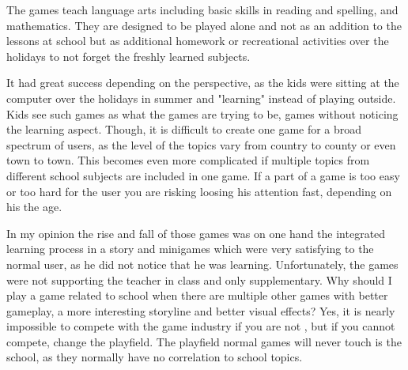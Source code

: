 The games teach language arts including basic skills in reading and spelling, and mathematics.
They are designed to be played alone and not as an addition to the lessons at school but as additional homework or
recreational activities over the holidays to not forget the freshly learned subjects.

It had great success depending on the perspective, as the kids were sitting at the computer over the holidays in summer
and "learning" instead of playing outside. Kids see such games as what the games are trying to be, games without noticing
the learning aspect. Though, it is difficult to create one game for a broad spectrum of users, as the level of the topics
vary from country to county or even town to town. This becomes even more complicated if multiple topics from different
school subjects are included in one game. If a part of a game is too easy or too hard for the user you are risking
loosing his attention fast, depending on his the age.

In my opinion the rise and fall of those games was on one hand the integrated learning process in a story and minigames which
were very satisfying to the normal user, as he did not notice that he was learning.
Unfortunately, the games were not supporting the teacher in class and only supplementary.
Why should I play a game related to school when there are multiple other games with better gameplay,
a more interesting storyline and better visual effects?
Yes, it is nearly impossible to compete with the game industry if you are not , but if you cannot compete, change the playfield.
The playfield normal games will never touch is the school, as they normally have no correlation to school topics.
